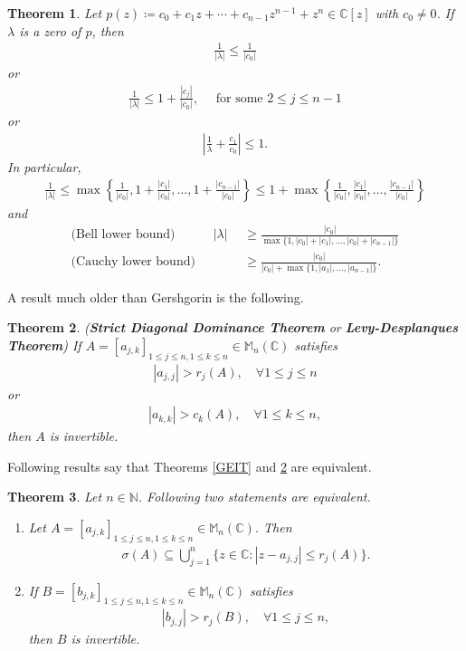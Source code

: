 \documentclass{amsart}
\newtheorem{theorem}{Theorem}[section]
\begin{document}
\begin{theorem} \cite{BELL, HORNJOHNSON}
	Let $p(z)\coloneqq c_0+c_1z+\cdots +c_{n-1}z^{n-1}+z^n \in \mathbb{C}[z]$ with $c_0\neq 0$.  If $\lambda$ is a  zero of $p$, then 	
		\begin{align*}
	\frac{1}{|\lambda|}\leq \frac{1}{|c_0|}
	\end{align*}
	or 
	\begin{align*}
		\frac{1}{|\lambda|}\leq 1+\frac{|c_j|}{|c_0|}, \quad \text{ for some } 2\leq j \leq n-1
	\end{align*}
	or 
	\begin{align*}
		\left|\frac{1}{\lambda}+\frac{c_1}{c_0}\right|\leq 1.
	\end{align*}
	In particular, 
	\begin{align*}
		\frac{1}{|\lambda|}\leq \max\left\{\frac{1}{|c_0|}, 1+\frac{|c_1|}{|c_0|}, \dots, 1+\frac{|c_{n-1}|}{|c_0|}\right\}\leq 1+\max\left\{\frac{1}{|c_0|}, \frac{|c_1|}{|c_0|}, \dots, \frac{|c_{n-1}|}{|c_0|}\right\}
	\end{align*}
	and 
	\begin{align*}
		\text{(Bell lower bound)} \quad \quad \quad	|\lambda|&\geq \frac{|c_0|}{\max\{1, |c_0|+|c_1|, \dots, |c_0|+|c_{n-1}|\}}\\
		\text{(Cauchy lower bound)} \quad \quad \quad 	&\geq \frac{|c_0|}{|c_0|+\max\{1, |a_1|, \dots, |a_{n-1}|\}}.
	\end{align*}
\end{theorem}
A result much older than Gershgorin is the following. 
\begin{theorem} \cite{VARGA, TAUSSKY, HORNJOHNSON, SCHNEIDER} \label{SDDT} (\textbf{Strict Diagonal Dominance Theorem} or \textbf{Levy-Desplanques Theorem})
	If  $A=[a_{j,k}]_{1\leq j\leq n, 1\leq k \leq n}\in  \mathbb{M}_n(\mathbb{C})$ satisfies
	\begin{align*}
		|a_{j,j}|>r_j(A), \quad \forall 1\leq j \leq n
	\end{align*}
	or 
	\begin{align*}
		|a_{k,k}|>c_k(A), \quad \forall 1\leq k \leq n,
	\end{align*}
	then $A$ is invertible. 
\end{theorem}
Following results say that Theorems \ref{GEIT} and \ref{SDDT} are equivalent.
\begin{theorem} \cite{VARGA}
	Let $n \in \mathbb{N}$.  Following two statements are equivalent. 
	\begin{enumerate}[\upshape(i)]
		\item Let $A=[a_{j,k}]_{1\leq j\leq n, 1\leq k \leq n}\in  \mathbb{M}_n(\mathbb{C})$. Then 
		\begin{align*}
			\sigma(A)\subseteq \bigcup_{j=1}^n\{z \in \mathbb{C}: |z-a_{j, j}|\leq r_j(A)\}.
		\end{align*}
		\item 	If  $B=[b_{j,k}]_{1\leq j\leq n, 1\leq k \leq n}\in  \mathbb{M}_n(\mathbb{C})$ satisfies
		\begin{align*}
			|b_{j,j}|>r_j(B), \quad \forall 1\leq j \leq n,
		\end{align*}
		then $B$ is invertible. 
	\end{enumerate}	
\end{theorem}
\end{document}
